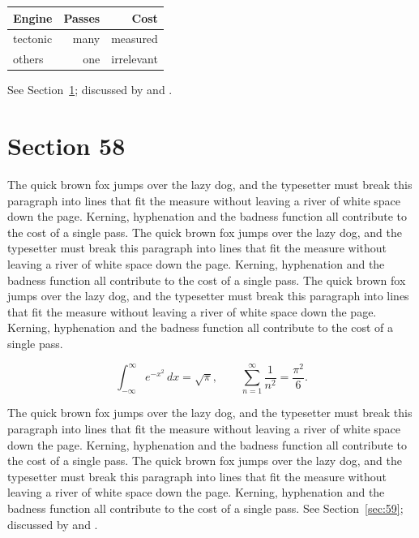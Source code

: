 \documentclass{article}
\begin{document}
\begin{center}
\begin{tabular}{lrr}
\toprule
Engine & Passes & Cost \\
\midrule
tectonic & many & measured \\
others & one & irrelevant \\
\bottomrule
\end{tabular}
\end{center}

See Section~\ref{sec:58}; discussed by \textcite{k3} and \textcite{l5}.
\section{Section 58}
\label{sec:58}
The quick brown fox jumps over the lazy dog, and the typesetter must break this paragraph into lines that fit the measure without leaving a river of white space down the page. Kerning, hyphenation and the badness function all contribute to the cost of a single pass. The quick brown fox jumps over the lazy dog, and the typesetter must break this paragraph into lines that fit the measure without leaving a river of white space down the page. Kerning, hyphenation and the badness function all contribute to the cost of a single pass. The quick brown fox jumps over the lazy dog, and the typesetter must break this paragraph into lines that fit the measure without leaving a river of white space down the page. Kerning, hyphenation and the badness function all contribute to the cost of a single pass. 

\begin{equation}\label{eq:58}
\int_{-\infty}^{\infty} e^{-x^{2}}\,dx = \sqrt{\pi}, \qquad
\sum_{n=1}^{\infty} \frac{1}{n^{2}} = \frac{\pi^{2}}{6}.
\end{equation}

The quick brown fox jumps over the lazy dog, and the typesetter must break this paragraph into lines that fit the measure without leaving a river of white space down the page. Kerning, hyphenation and the badness function all contribute to the cost of a single pass. The quick brown fox jumps over the lazy dog, and the typesetter must break this paragraph into lines that fit the measure without leaving a river of white space down the page. Kerning, hyphenation and the badness function all contribute to the cost of a single pass. 
See Section~\ref{sec:59}; discussed by \textcite{k4} and \textcite{l1}.
\end{document}

